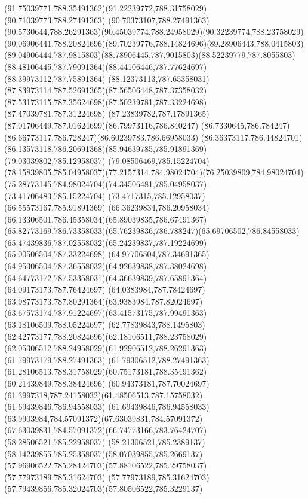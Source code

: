 {{	\curveto(91.75039771,788.35491362)(91.22239772,788.31758029)(90.71039773,788.27491363)
	\lineto(90.70373107,788.27491363)
	\curveto(90.5730644,788.26291363)(90.45039774,788.24958029)(90.32239774,788.23758029)
	\curveto(90.06906441,788.20824696)(89.70239776,788.14824696)(89.28906443,788.0415803)
	\curveto(89.04906444,787.9815803)(88.78906445,787.9015803)(88.52239779,787.8055803)
	\curveto(88.48106445,787.79091364)(88.44106446,787.77624697)(88.39973112,787.75891364)
	\curveto(88.12373113,787.65358031)(87.83973114,787.52691365)(87.56506448,787.37358032)
	\curveto(87.53173115,787.35624698)(87.50239781,787.33224698)(87.47039781,787.31224698)
	\curveto(87.23839782,787.17891365)(87.01706449,787.01624699)(86.79973116,786.840247)
	\curveto(86.7330645,786.784247)(86.66773117,786.728247)(86.60239783,786.66958033)
	\curveto(86.36373117,786.44824701)(86.13573118,786.20691368)(85.94639785,785.91891369)
	\lineto(79.03039802,785.12958037)
	\lineto(79.08506469,785.15224704)
	\curveto(78.15839805,785.04958037)(77.2157314,784.98024704)(76.25039809,784.98024704)
	\curveto(75.28773145,784.98024704)(74.34506481,785.04958037)(73.41706483,785.15224704)
	\lineto(73.4717315,785.12958037)
	\lineto(66.55573167,785.91891369)
	\curveto(66.36239834,786.20958034)(66.13306501,786.45358034)(65.89039835,786.67491367)
	\curveto(65.82773169,786.73358033)(65.76239836,786.788247)(65.69706502,786.84558033)
	\curveto(65.47439836,787.02558032)(65.24239837,787.19224699)(65.00506504,787.33224698)
	\curveto(64.97706504,787.34691365)(64.95306504,787.36558032)(64.92639838,787.38024698)
	\curveto(64.64773172,787.53358031)(64.36639839,787.65891364)(64.09173173,787.76424697)
	\curveto(64.0383984,787.78424697)(63.98773173,787.80291364)(63.9383984,787.82024697)
	\curveto(63.67573174,787.91224697)(63.41573175,787.99491363)(63.18106509,788.05224697)
	\curveto(62.77839843,788.1495803)(62.42773177,788.20824696)(62.18106511,788.23758029)
	\curveto(62.05306512,788.24958029)(61.92906512,788.26291363)(61.79973179,788.27491363)
	\lineto(61.79306512,788.27491363)
	\curveto(61.28106513,788.31758029)(60.75173181,788.35491362)(60.21439849,788.38424696)
	\curveto(60.94373181,787.70024697)(61.3997318,787.24158032)(61.48506513,787.15758032)
	\lineto(61.69439846,786.94558033)
	\curveto(61.69439846,786.94558033)(63.9903984,784.57091372)(67.63039831,784.57091372)
	\curveto(67.63039831,784.57091372)(66.74773166,783.76424707)(58.28506521,785.22958037)
	\curveto(58.21306521,785.2389137)(58.14239855,785.25358037)(58.07039855,785.2669137)
	\curveto(57.96906522,785.28424703)(57.88106522,785.29758037)(57.77973189,785.31624703)
	\curveto(57.77973189,785.31624703)(57.79439856,785.32024703)(57.80506522,785.3229137)
}}
